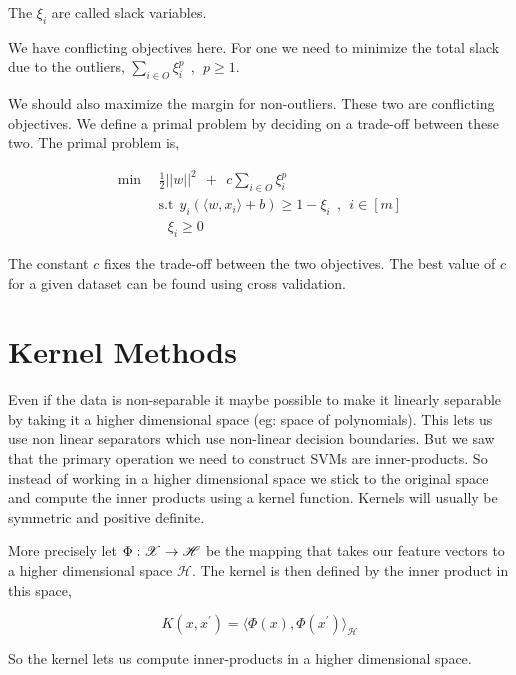 \documentclass[a4paper,english,12pt]{article}
\begin{document}
The $\xi_i$ are called slack variables. 

We have conflicting objectives here. For one we need to minimize the total slack due to the outliers,   $ \sum_{i \in O} \xi_i^p~~,~~p \geq 1.$

We should also maximize the margin for non-outliers. These two are conflicting objectives. We define a primal problem by deciding on a trade-off between these two. The primal problem is,

\begin{align}
\text{min} ~~& \frac12 ||w||^2 ~~+ ~~c \sum_{i \in O} \xi_i^p \\
~~& \text{s.t} ~~  y_i( \langle w, x_i \rangle + b) \geq   1 - \xi_i ~~,~~ i \in [m] \\
~~~~~&~~~ \xi_i \geq 0
\end{align}  


The constant $c$ fixes the trade-off between the two objectives. The best value of $c$ for a given dataset can be found using cross validation.


\section{Kernel Methods}

Even if the data is non-separable it maybe possible to make it linearly separable by taking it a higher dimensional space (eg: space of polynomials). This lets us use non linear separators which use non-linear decision boundaries. But we saw that the primary operation we need to construct SVMs are inner-products. So instead of working in a higher dimensional space we stick to the original space and compute the inner products using a kernel function. Kernels will usually be symmetric and positive definite.

More precisely let $\Phi : \mathscr{X} \rightarrow \mathscr{H}$ be the mapping that takes our feature vectors to a higher dimensional space  $\mathscr{H}$. The kernel is then defined by the inner product in this space,

$$K(x, x^\prime) = \langle \Phi(x), \Phi(x^\prime) \rangle_{\mathscr{H}} $$

So the kernel lets us compute inner-products in a higher dimensional space.
\end{document}
